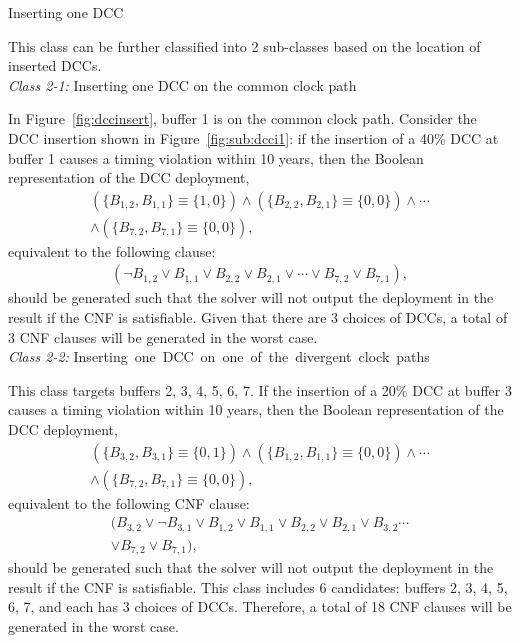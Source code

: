 \begin{class}
\label{class:c2}
Inserting one DCC

This class can be further classified into 2 sub-classes based on the location of inserted DCCs. \\
\textit{Class 2-1:} Inserting one DCC on the common clock path

In Figure~\ref{fig:dccinsert}, buffer 1 is on the common clock path. Consider the DCC insertion shown in Figure~\ref{fig:sub:dcci1}: if the insertion of a 40\% DCC at buffer 1 causes a timing violation within 10 years, then the Boolean representation of the DCC deployment,
{\fontsize{9}{10}
\begin{gather*}
\left(\{B_{1,2}, B_{1,1}\} \equiv \{1, 0\} \right) \land \left( \{B_{2,2}, B_{2,1}\} \equiv \{0, 0\} \right) \land \dotsb \\
\land \left( \{B_{7,2}, B_{7,1}\} \equiv \{0, 0\} \right),
\end{gather*}}
equivalent to the following clause:
{\fontsize{9}{10}
\begin{gather*}
\left(\neg B_{1,2} \lor B_{1,1} \lor B_{2,2} \lor B_{2,1} \lor \dotsb \lor B_{7,2} \lor B_{7,1} \right),
\end{gather*}}
should be generated such that the solver will not output the deployment in the result if the CNF is satisfiable. Given that there are 3 choices of DCCs, a total of 3 CNF clauses will be generated in the worst case. \\
\textit{Class 2-2:} \mbox{\fontsize{9}{10.8}\selectfont Inserting one DCC on one of the divergent clock paths}

This class targets buffers 2, 3, 4, 5, 6, 7. If the insertion of a 20\% DCC at buffer 3 causes a timing violation within 10 years, then the Boolean representation of the DCC deployment, 
{\fontsize{9}{10}
\begin{gather*}
\left(\{B_{3,2}, B_{3,1}\} \equiv \{0, 1\} \right) \land \left( \{B_{1,2}, B_{1,1}\} \equiv \{0, 0\} \right) \land \dotsb \\
\land \left( \{B_{7,2}, B_{7,1}\} \equiv \{0, 0\} \right),
\end{gather*}} 
equivalent to the following CNF clause:
{\fontsize{9}{10}
\begin{gather*}
(B_{3,2} \lor \neg B_{3,1} \lor B_{1,2} \lor B_{1,1} \lor B_{2,2} \lor B_{2,1} \lor B_{3,2} \dotsb \\ 
\lor B_{7,2} \lor B_{7,1}),
\end{gather*}}
should be generated such that the solver will not output the deployment in the result if the CNF is satisfiable. This class includes 6 candidates: buffers 2, 3, 4, 5, 6, 7, and each has 3 choices of DCCs. Therefore, a total of 18 CNF clauses will be generated in the worst case.
\end{class}

